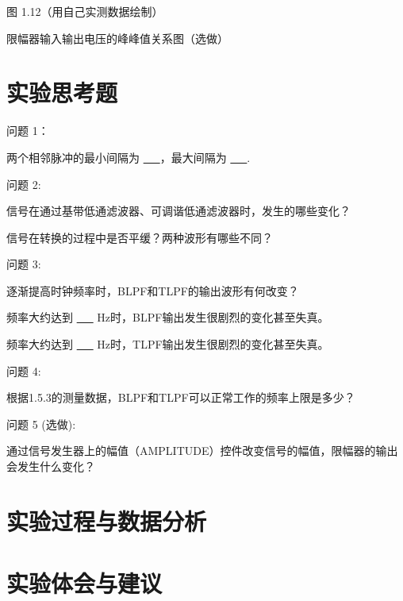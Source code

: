 \documentclass{sasreport}
\begin{document}
\begin{center}
    图 1.12（用自己实测数据绘制）
\end{center}

\begin{center}
    限幅器输入输出电压的峰峰值关系图（选做）
\end{center}

\section{实验思考题}
问题 1：

两个相邻脉冲的最小间隔为 \underline{\ \ \ }，最大间隔为 \underline{\ \ \ }.

问题 2:

信号在通过基带低通滤波器、可调谐低通滤波器时，发生的哪些变化？

信号在转换的过程中是否平缓？两种波形有哪些不同？

问题 3:

逐渐提高时钟频率时，BLPF和TLPF的输出波形有何改变？

频率大约达到  \underline{\ \ \ } Hz时，BLPF输出发生很剧烈的变化甚至失真。

频率大约达到  \underline{\ \ \ } Hz时，TLPF输出发生很剧烈的变化甚至失真。

问题 4:

根据1.5.3的测量数据，BLPF和TLPF可以正常工作的频率上限是多少？

问题 5 (选做):

通过信号发生器上的幅值（AMPLITUDE）控件改变信号的幅值，限幅器的输出会发生什么变化？

\section{实验过程与数据分析}

\section{实验体会与建议}
\end{document}
